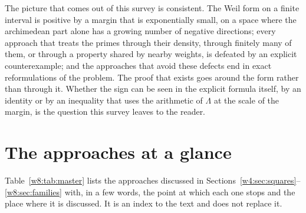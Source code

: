 \documentclass[11pt]{amsart}
\theoremstyle{definition}
\theoremstyle{remark}
\numberwithin{equation}{section}
\begin{document}
\medskip
The picture that comes out of this survey is consistent. The Weil form on a finite interval is positive by a
margin that is exponentially small, on a space where the archimedean part alone has a growing number of negative
directions; every approach that treats the primes through their density, through finitely many of them, or
through a property shared by nearby weights, is defeated by an explicit counterexample; and the approaches that
avoid these defects end in exact reformulations of the problem. The proof that exists goes around the form
rather than through it. Whether the sign can be seen in the explicit formula itself, by an identity or by an
inequality that uses the arithmetic of $\Lambda$ at the scale of the margin, is the question this survey leaves
to the reader.

\appendix
\section{The approaches at a glance}\label{w8:sec:table}

Table~\ref{w8:tab:master} lists the approaches discussed in Sections~\ref{w4:sec:squares}--\ref{w8:sec:families}
with, in a few words, the point at which each one stops and the place where it is discussed. It is an index to the
text and does not replace it.
\end{document}

